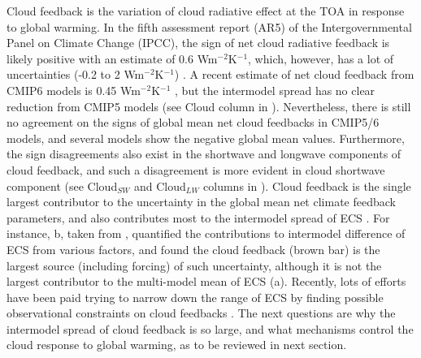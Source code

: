 Cloud feedback is the variation of cloud radiative effect at the TOA in response to global warming. In the fifth assessment report (AR5) of the Intergovernmental Panel on Climate Change (IPCC), the sign of net cloud radiative feedback is likely positive with an estimate of 0.6 Wm$^{-2}$K$^{-1}$, which, however, has a lot of uncertainties (-0.2 to 2 Wm$^{-2}$K$^{-1}$) \citep{Stocker2013}. A recent estimate of net cloud feedback from CMIP6 models is 0.45 Wm$^{-2}$K$^{-1}$ \citep{Zelinka2020causes,Sherwood2020}, but the intermodel spread has no clear reduction from CMIP5 models (see Cloud column in ). Nevertheless, there is still no agreement on the signs of global mean net cloud feedbacks in CMIP5/6 models, and several models show the negative global mean values. Furthermore, the sign disagreements also exist in the shortwave and longwave components of cloud feedback, and such a disagreement is more evident in cloud shortwave component (see Cloud$_{SW}$ and Cloud$_{LW}$ columns in ). Cloud feedback is the single largest contributor to the uncertainty in the global mean net climate feedback parameters, and also contributes most to the intermodel spread of ECS \citep{Bony2005,Soden2006,Dufresne2008assessment,Colman2011tropospheric,Vial2013,Ceppi2017,Zelinka2020causes,Sherwood2020}. For instance, b, taken from \cite{Dufresne2008assessment}, quantified the contributions to intermodel difference of ECS from various factors, and found the cloud feedback (brown bar) is the largest source (including forcing) of such uncertainty, although it is not the largest contributor to the multi-model mean of ECS (a). Recently, lots of efforts have been paid trying to narrow down the range of ECS by finding possible observational constraints on cloud feedbacks \citep[e.g.,][]{Cesana2021,Myers2021}. The next questions are why the intermodel spread of cloud feedback is so large, and what mechanisms control the cloud response to global warming, as to be reviewed in next section. 



